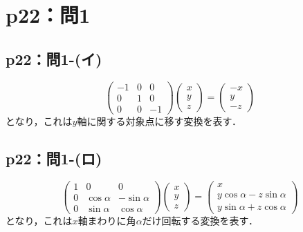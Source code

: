 \documentclass[a4paper,10pt,fleqn]{ltjsarticle}
\begin{document}
\newpage

\section*{p22：問1}


\subsection*{p22：問1-(イ)}
\begin{tleftbar}
  \[
    \begin{pmatrix}
      -1 & 0 & 0  \\
      0  & 1 & 0  \\
      0  & 0 & -1
    \end{pmatrix}
    \begin{pmatrix}
      x \\
      y \\
      z
    \end{pmatrix}
    =\begin{pmatrix}
      -x \\
      y  \\
      -z
    \end{pmatrix}
  \]
  となり，これは$y$軸に関する対象点に移す変換を表す．
\end{tleftbar}

\subsection*{p22：問1-(ロ)}
\begin{tleftbar}
  \[
    \begin{pmatrix}
      1 & 0           & 0            \\
      0 & \cos \alpha & -\sin \alpha \\
      0 & \sin \alpha & \cos \alpha
    \end{pmatrix}
    \begin{pmatrix}
      x \\
      y \\
      z
    \end{pmatrix}
    =
    \begin{pmatrix}
      x                            \\
      y \cos \alpha -z \sin \alpha \\
      y \sin \alpha + z \cos \alpha
    \end{pmatrix}
  \]
  となり，これは$x$軸まわりに角$\alpha$だけ回転する変換を表す．
\end{tleftbar}
\end{document}
